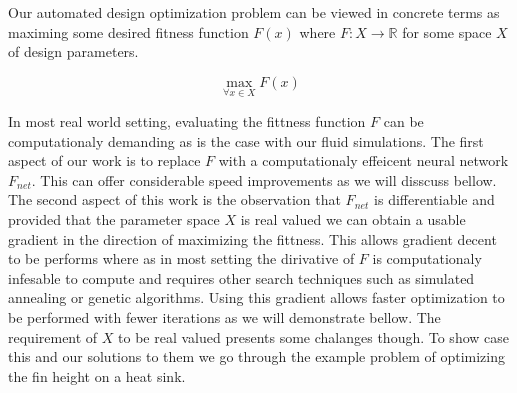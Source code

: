 \documentclass{article} %
\begin{document}
Our automated design optimization problem can be viewed in concrete terms as maximing some desired fitness function $F(x)$ where $F:X \rightarrow \mathbb{R}$ for some space $X$ of design parameters.

\begin{equation}
  \max_{\forall x \in X} F(x)
\end{equation}

In most real world setting, evaluating the fittness function $F$ can be computationaly demanding as is the case with our fluid simulations. The first aspect of our work is to replace $F$ with a computationaly effeicent neural network $F_{net}$. This can offer considerable speed improvements as we will disscuss bellow. The second aspect of this work is the observation that $F_{net}$ is differentiable and provided that the parameter space $X$ is real valued we can obtain a usable gradient in the direction of maximizing the fittness. This allows gradient decent to be performs where as in most setting the dirivative of $F$ is computationaly infesable to compute and requires other search techniques such as simulated annealing or genetic algorithms. Using this gradient allows faster optimization to be performed with fewer iterations as we will demonstrate bellow. The requirement of $X$ to be real valued presents some chalanges though. To show case this and our solutions to them we go through the example problem of optimizing the fin height on a heat sink.
\end{document}
